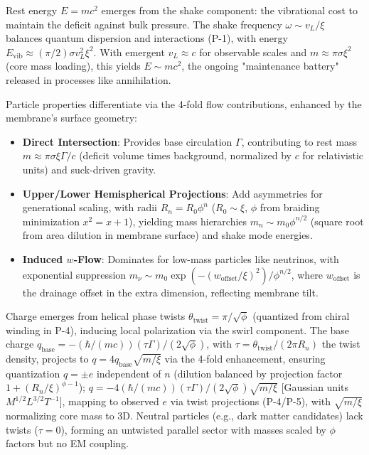 Rest energy $E = m c^2$ emerges from the shake component: the vibrational cost to maintain the deficit against bulk pressure. The shake frequency $\omega \sim v_L / \xi$ balances quantum dispersion and interactions (P-1), with energy $E_{\text{vib}} \approx (\pi/2) \sigma v_L^2 \xi^2$. With emergent $v_L \approx c$ for observable scales and $m \approx \pi \sigma \xi^2$ (core mass loading), this yields $E \sim m c^2$, the ongoing "maintenance battery" released in processes like annihilation.

Particle properties differentiate via the 4-fold flow contributions, enhanced by the membrane's surface geometry:
\begin{itemize}
\item \textbf{Direct Intersection}: Provides base circulation $\Gamma$, contributing to rest mass $m \approx \pi \sigma \xi \Gamma / c$ (deficit volume times background, normalized by $c$ for relativistic units) and suck-driven gravity.
\item \textbf{Upper/Lower Hemispherical Projections}: Add asymmetries for generational scaling, with radii $R_n = R_0 \phi^n$ ($R_0 \sim \xi$, $\phi$ from braiding minimization $x^2 = x + 1$), yielding mass hierarchies $m_n \sim m_0 \phi^{n/2}$ (square root from area dilution in membrane surface) and shake mode energies.
\item \textbf{Induced $w$-Flow}: Dominates for low-mass particles like neutrinos, with exponential suppression $m_\nu \sim m_0 \exp(- (w_{\text{offset}} / \xi)^2 ) / \phi^{n/2}$, where $w_{\text{offset}}$ is the drainage offset in the extra dimension, reflecting membrane tilt.
\end{itemize}

Charge emerges from helical phase twists $\theta_{\text{twist}} = \pi / \sqrt{\phi}$ (quantized from chiral winding in P-4), inducing local polarization via the swirl component. The base charge $q_{\text{base}} = - (\hbar / (m c)) (\tau \Gamma) / (2 \sqrt{\phi})$, with $\tau = \theta_{\text{twist}} / (2 \pi R_n)$ the twist density, projects to $q = 4 q_{\text{base}} \sqrt{m / \xi}$ via the 4-fold enhancement, ensuring quantization $q = \pm e$ independent of $n$ (dilution balanced by projection factor $1 + (R_n / \xi)^{\phi - 1}$); $q = -4 (\hbar / (m c)) (\tau \Gamma) / (2 \sqrt{\phi}) \sqrt{m / \xi}$ [Gaussian units $M^{1/2} L^{3/2} T^{-1}$], mapping to observed $e$ via twist projections (P-4/P-5), with $\sqrt{m / \xi}$ normalizing core mass to 3D. Neutral particles (e.g., dark matter candidates) lack twists ($\tau = 0$), forming an untwisted parallel sector with masses scaled by $\phi$ factors but no EM coupling.

